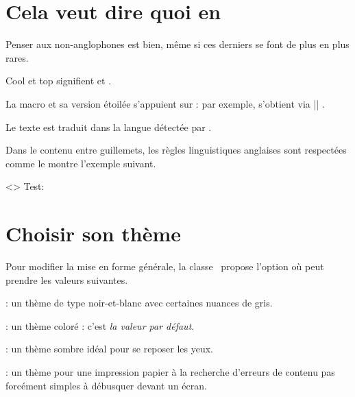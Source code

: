 \section{Cela veut dire quoi en }

Penser aux non-anglophones est bien, même si ces derniers se font de plus en plus rares.

\begin{tdoclatex}
Cool et top signifient  et .
\end{tdoclatex}


La macro  et sa version étoilée s'appuient sur  : par exemple,  s'obtient via \tdoclatexin|| .


\begin{tdocnote}
    Le texte  est traduit dans la langue détectée par \thisproj.
\end{tdocnote}


Dans le contenu entre guillemets, les règles linguistiques anglaises sont respectées comme le montre l'exemple suivant.

\begin{tdoclatex}<>
          Test:   \\
\end{tdoclatex}


\section{Choisir son thème}

Pour modifier la mise en forme générale, la classe \thisproj\ propose l'option  où  peut prendre les valeurs suivantes.

\begin{tasks}[style=itemize]
    \task {}:
          un thème de type noir-et-blanc avec certaines nuances de gris.

    \task {}:
          un thème coloré : c'est \emph{la valeur par défaut}.

    \task {}:
          un thème sombre idéal pour se reposer les yeux.

    \task {}:
          un thème pour une impression papier à la recherche d'erreurs de contenu pas forcément simples à débusquer devant un écran.
\end{tasks}


